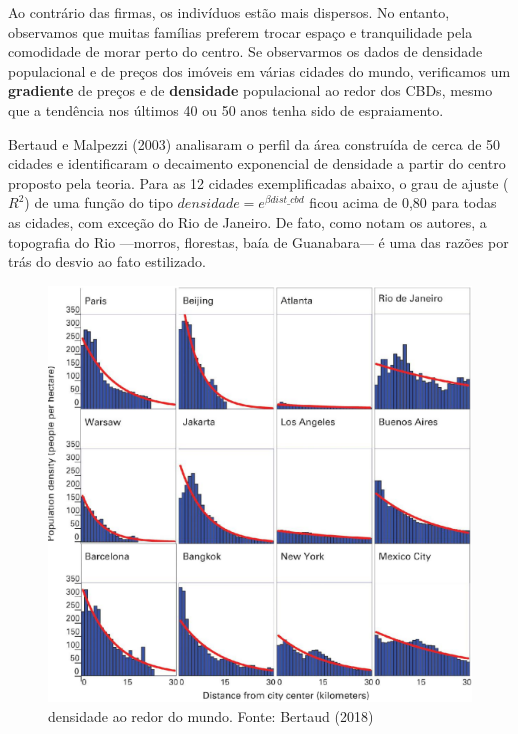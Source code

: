 \documentclass[
  12pt,
  a4paper,
]{article}
\begin{document}
Ao contrário das firmas, os indivíduos estão mais dispersos. No entanto,
observamos que muitas famílias preferem trocar espaço e tranquilidade
pela comodidade de morar perto do centro. Se observarmos os dados de
densidade populacional e de preços dos imóveis em várias cidades do
mundo, verificamos um \textbf{gradiente} de preços e de
\textbf{densidade} populacional ao redor dos CBDs, mesmo que a tendência
nos últimos 40 ou 50 anos tenha sido de espraiamento.

Bertaud e Malpezzi (2003) analisaram o perfil da área construída de
cerca de 50 cidades e identificaram o decaimento exponencial de
densidade a partir do centro proposto pela teoria. Para as 12 cidades
exemplificadas abaixo, o grau de ajuste (\(R^2\)) de uma função do tipo
\(densidade = e^{\beta dist\_cbd}\) ficou acima de 0,80 para todas as
cidades, com exceção do Rio de Janeiro. De fato, como notam os autores,
a topografia do Rio ---morros, florestas, baía de Guanabara--- é uma das
razões por trás do desvio ao fato estilizado.

\begin{figure}

{\centering \includegraphics[width=7.68in]{src/images/bertaud_density} 

}

\caption{\label{fig:density} densidade ao redor do mundo. Fonte: Bertaud (2018)}\label{fig:density}
\end{figure}
\end{document}
